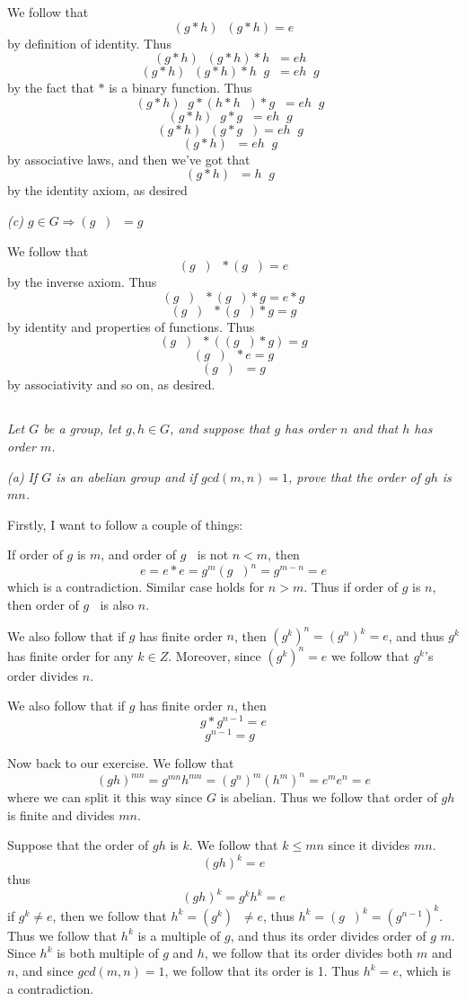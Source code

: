 \documentclass[11pt,oneside,titlepage]{book}
\DeclareMathOperator \inv {^{-1}}
\DeclareMathOperator \ra {\Rightarrow}
\begin{document}
We follow that
$$(g * h)\inv  (g * h) = e$$
by definition of identity. Thus
$$(g * h)\inv  (g * h) * h\inv  = e h\inv$$
$$(g * h)\inv  (g * h) * h\inv  g\inv  = e h\inv g\inv$$
by the fact that $*$ is a binary function. Thus
$$(g * h)\inv  g * (h * h\inv) * g\inv  = e h\inv g\inv$$
$$(g * h)\inv  g * g\inv  = e h\inv g\inv$$
$$(g * h)\inv  (g * g\inv)  = e h\inv g\inv$$
$$(g * h)\inv = e h\inv g\inv$$
by associative laws, and then we've got that
$$(g * h)\inv = h\inv g\inv$$
by the identity axiom, as desired

\textit{(c) $g \in G \ra (g\inv) \inv = g$}

We follow that
$$(g\inv) \inv * (g\inv) = e$$
by the inverse axiom. Thus
$$(g\inv)\inv * (g\inv) * g  = e * g$$
$$(g\inv)\inv * (g\inv) * g  = g$$
by identity and properties of functions. Thus
$$(g\inv)\inv * ((g\inv) * g)  = g$$
$$(g\inv)\inv * e  = g$$
$$(g\inv)\inv  = g$$
by associativity and so on, as desired.

\subsection{}

\textit{Let $G$ be a group, let $g, h \in G$, and suppose that $g$ has
order $n$ and that $h$ has order $m$.}

\textit{(a) If $G$ is an abelian group and if $gcd(m, n) = 1$, prove
that the order of $gh$ is $mn$.}

Firstly, I want to follow a couple of things:

If order of $g$ is $m$, and order of $g\inv$ is not $n < m$, then
$$e = e * e = g^m (g\inv)^n = g^{m - n} = e$$
which is a contradiction. Similar case holds for $n > m$.  Thus if
order of $g$ is $n$, then order of $g\inv$ is also $n$.

We also follow that if $g$ has finite order $n$, then $(g^k)^n =
(g^n)^k = e$, and thus $g^k$ has finite order for any $k \in Z$.
Moreover, since $(g^k)^n = e$ we follow that $g^k$'s order divides
$n$.

We also follow that if $g$ has finite order $n$, then
$$g * g^{n - 1} = e$$
$$g^{n - 1} = g\inv$$


Now back to our exercise. We follow that
$$(gh)^{mn} = g^{mn} h^{mn} = (g^{n})^m (h^m)^n = e^m e^n = e$$
where we can split it this way since $G$ is abelian. Thus we follow
that order of $gh$ is finite and divides $mn$.

Suppose that the order of $gh$ is $k$. We follow that $k \leq mn$
since it divides $mn$.
$$(gh)^k = e$$
thus
$$(gh)^k = g^k h^k = e$$
if $g^k \neq e$, then we follow that $h^k = (g^k) \inv \neq e$, thus
$h^k = (g\inv)^k = (g^{n - 1})^k$. Thus we follow that $h^k$ is a
multiple of $g$, and thus its order divides order of $g$ $m$. Since
$h^k$ is both multiple of $g$ and $h$, we follow that its order
divides both $m$ and $n$, and since $gcd(m, n) = 1$, we follow that
its order is 1. Thus $h^k = e$, which is a contradiction.
\end{document}

